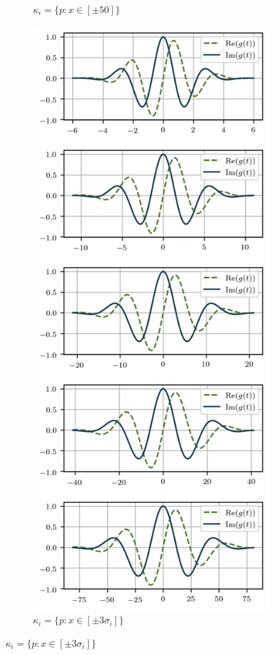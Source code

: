 \documentclass[journal]{IEEEtran}
\begin{document}
\begin{figure}[!ht]
\begin{subfigure}[b]{0.22\textwidth}
		\caption{$\kappa_{i} = \lbrace p: x \in [\pm 50] \rbrace$}
		\label{fig:1D_space_Gaborfilterbank_wo_env}
	\end{subfigure}
	\qquad %
	\begin{subfigure}[b]{0.22\textwidth}
		\centering
		\includegraphics[width=\textwidth]{1D_space_GaborBank_m5_env}
		\caption{$\kappa_{i} = \lbrace p: x \in [\pm 3\sigma_{i}] \rbrace$}
		\label{fig:1D_space_Gaborfilterbank_env}
	\end{subfigure}


\end{figure}
\end{document}
